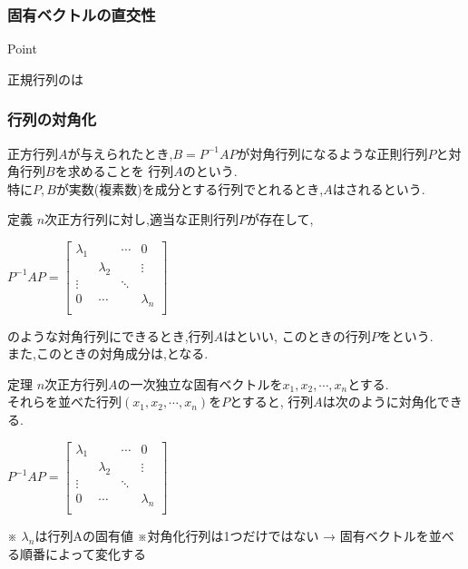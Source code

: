 \documentclass[a4paper]{jsarticle}
\begin{document}
\subsubsection{固有ベクトルの直交性}
\begin{itembox}[l]{Point}
    \begin{center}
        正規行列のは\\
    \end{center}
\end{itembox}

\subsubsection{行列の対角化}
正方行列$A$が与えられたとき,$B=P^{-1}AP$が対角行列になるような正則行列$P$と対角行列$B$を求めることを
行列$A$のという.\\
特に$P,B$が実数(複素数)を成分とする行列でとれるとき,$A$はされるという.
\begin{itembox}[l]{定義}
    $n$次正方行列に対し,適当な正則行列$P$が存在して,\\
    \begin{center}
        $P^{-1}AP=
            \begin{bmatrix}
                \lambda_1 &           & \cdots & 0         \\
                          & \lambda_2 &        & \vdots    \\
                \vdots    &           & \ddots &           \\
                0         & \cdots    &        & \lambda_n \\
            \end{bmatrix}
        $
    \end{center}
    のような対角行列にできるとき,行列$A$はといい,
    このときの行列$P$をという.\\
    また,このときの対角成分は,となる.
\end{itembox}
\begin{itembox}[l]{定理}
    $n$次正方行列$A$の一次独立な固有ベクトルを$x_1,x_2,\cdots,x_n$とする.\\
    それらを並べた行列$\left(x_1,x_2,\cdots,x_n\right)$を$P$とすると,
    行列$A$は次のように対角化できる.
    \begin{center}
        $P^{-1}AP=
            \begin{bmatrix}
                \lambda_1 &           & \cdots & 0         \\
                          & \lambda_2 &        & \vdots    \\
                \vdots    &           & \ddots &           \\
                0         & \cdots    &        & \lambda_n \\
            \end{bmatrix}
        $
    \end{center}
    ※ $\lambda_n$は行列Aの固有値
    ※対角化行列は1つだけではない → 固有ベクトルを並べる順番によって変化する
\end{itembox}
\end{document}
